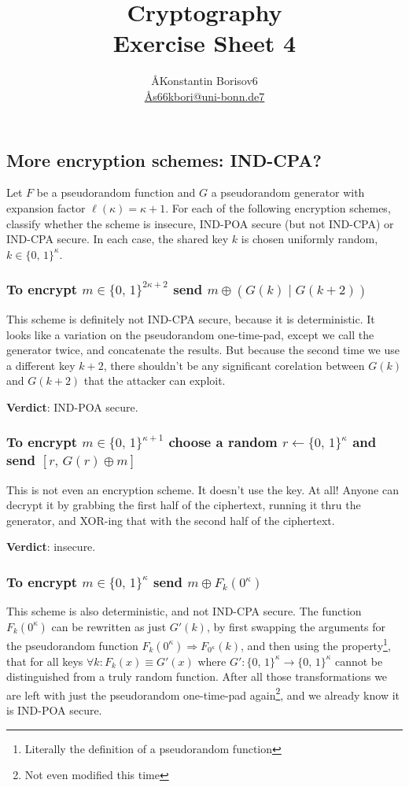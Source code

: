 \documentclass{article}
\title{Cryptography \\ Exercise Sheet 4}
\author{
  \AA{Konstantin Borisov}{6} \\
  \href{mailto:\AA{s66kbori@uni-bonn.de}{7}}{\AA{s66kbori@uni-bonn.de}{7}}
}
\begin{document}
  \maketitle

  \setcounter{section}{4}
  \subsection{More encryption schemes: IND-CPA?}
  \begin{centerframebox}
    Let $F$ be a pseudorandom function and $G$ a pseudorandom generator with expansion factor $\ell(\kappa) = \kappa + 1$.
    For each of the following encryption schemes, classify whether the scheme is insecure, IND-POA secure (but not IND-CPA) or IND-CPA secure.
    In each case, the shared key $k$ is chosen uniformly random, $k \in \{0,\, 1\}^\kappa$.

  \end{centerframebox}
  \subsubsection{To encrypt $m \in \{0,\, 1\}^{2\kappa+2}$ send $m \oplus (G(k) \mid G(k + 2))$}
  This scheme is definitely not IND-CPA secure, because it is deterministic.
  It looks like a variation on the pseudorandom one-time-pad, except we call the generator twice,
  and concatenate the results.
  But because the second time we use a different key $k + 2$,
  there shouldn't be any significant corelation between $G(k)$ and $G(k + 2)$ that the attacker can exploit.

  \textbf{Verdict}: IND-POA secure.

  \subsubsection{To encrypt $m \in \{0,\, 1\}^{\kappa+1}$ choose a random $r \leftarrow \{0,\, 1\}^\kappa$ and send $[r,\, G(r) \oplus m]$}
  This is not even an encryption scheme. It doesn't use the key. At all!
  Anyone can decrypt it by grabbing the first half of the ciphertext, running it thru the generator, and XOR-ing that with the second half of the ciphertext.

  \textbf{Verdict}: insecure.

  \subsubsection{To encrypt $m \in \{0,\, 1\}^{\kappa}$ send $m \oplus F_k(0^\kappa)$}
  This scheme is also deterministic, and not IND-CPA secure.
  The function $F_k(0^\kappa)$ can be rewritten as just $G'(k)$,
  by first swapping the arguments for the pseudorandom function $F_k(0^\kappa) \Rightarrow F_{0^\kappa}(k)$,
  and then using the property\footnote{Literally the definition of a pseudorandom function},
  that for all keys $\forall k : F_k(x) \equiv G'(x)$ where $G': \{0,\, 1\}^{\kappa} \to \{0,\, 1\}^{\kappa}$ cannot be distinguished from a truly random function.
  After all those transformations we are left with just the pseudorandom one-time-pad again\footnote{Not even modified this time},
  and we already know it is IND-POA secure.
\end{document}
